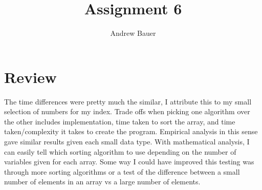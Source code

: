 \documentclass{article}
\begin{document}
\title{Assignment 6}
\author{Andrew Bauer}

\maketitle

\section{Review}
The time differences were pretty much the similar, I attribute this to my small selection of numbers for my index. Trade offs when picking one algorithm over the other includes implementation, time taken to sort the array, and time taken/complexity it takes to create the program. Empirical analysis in this sense gave similar results given each small data type. With mathematical analysis, I can easily tell which sorting algorithm to use depending on the number of variables given for each array. Some way I could have improved this testing was through more sorting algorithms or a test of the difference between a small number of elements in an array vs a large number of elements.
\end{document}
